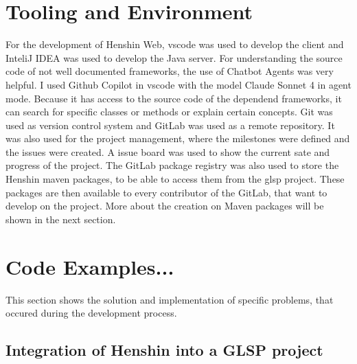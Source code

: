   \section{Tooling and Environment}
  \label{subsec:tooling}
  For the development of Henshin Web, \ac{vscode} \cite{vscode} was used to develop the client and InteliJ IDEA \cite{intellij} was used to develop the Java server.
  For understanding the source code of not well documented frameworks, the use of Chatbot Agents was very helpful. I used Github Copilot in \ac{vscode} with the model Claude Sonnet 4 \cite{claude_sonnet} in agent mode. Because it has access to the source code of the dependend frameworks, it can search for specific classes or methods or explain certain concepts.
  Git was used as version control system and GitLab was used as a remote repository. It was also used for the project management, where the milestones were defined and the issues were created. A issue board was used to show the current sate and progress of the project. The GitLab package registry was also used to store the Henshin maven packages, to be able to access them from the \ac{glsp} project. These packages are then available to every contributor of the GitLab, that want to develop on the project. More about the creation on Maven packages will be shown in the next section.

  \section{Code Examples...}
  \label{subsec:code-examples}

  This section shows the solution and implementation of specific problems, that occured during the development process.

  \subsection{Integration of Henshin into a GLSP project} 
  \label{subsec:henshin-glsp}

